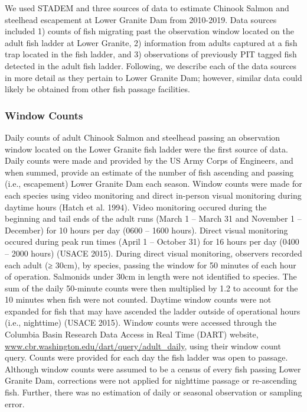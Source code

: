 \documentclass[
  12pt,
]{article}
\begin{document}
We used STADEM and three sources of data to estimate Chinook Salmon and steelhead escapement at Lower Granite Dam from 2010-2019. Data sources included 1) counts of fish migrating past the observation window located on the adult fish ladder at Lower Granite, 2) information from adults captured at a fish trap located in the fish ladder, and 3) observations of previously PIT tagged fish detected in the adult fish ladder. Following, we describe each of the data sources in more detail as they pertain to Lower Granite Dam; however, similar data could likely be obtained from other fish passage facilities.

\hypertarget{window-counts}{%
\subsubsection{Window Counts}\label{window-counts}}

Daily counts of adult Chinook Salmon and steelhead passing an observation window located on the Lower Granite fish ladder were the first source of data. Daily counts were made and provided by the US Army Corps of Engineers, and when summed, provide an estimate of the number of fish ascending and passing (i.e., escapement) Lower Granite Dam each season. Window counts were made for each species using video monitoring and direct in-person visual monitoring during daytime hours (Hatch et al. 1994). Video monitoring occured during the beginning and tail ends of the adult runs (March 1 -- March 31 and November 1 -- December) for 10 hours per day (0600 -- 1600 hours). Direct visual monitoring occured during peak run times (April 1 -- October 31) for 16 hours per day (0400 -- 2000 hours) (USACE 2015). During direct visual monitoring, observers recorded each adult (≥ 30cm), by species, passing the window for 50 minutes of each hour of operation. Salmonids under 30cm in length were not identified to species. The sum of the daily 50-minute counts were then multiplied by 1.2 to account for the 10 minutes when fish were not counted. Daytime window counts were not expanded for fish that may have ascended the ladder outside of operational hours (i.e., nighttime) (USACE 2015). Window counts were accessed through the Columbia Basin Research Data Access in Real Time (DART) website, \url{www.cbr.washington.edu/dart/query/adult_daily}, using their window count query. Counts were provided for each day the fish ladder was open to passage. Although window counts were assumed to be a census of every fish passing Lower Granite Dam, corrections were not applied for nighttime passage or re-ascending fish. Further, there was no estimation of daily or seasonal observation or sampling error.
\end{document}
